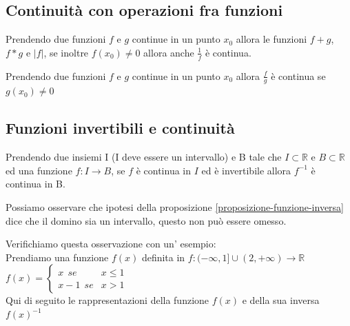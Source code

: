 \subsection{Continuità con operazioni fra funzioni}
\begin{theorem}
    Prendendo due funzioni $f$ e $g$ continue in un punto $x_0$ allora le funzioni $f + g$, $f * g$ e $|f|$, se inoltre $f(x_0) \neq 0$ allora anche $\frac{1}{f}$ è continua.
    \begin{corollaries}
        Prendendo due funzioni $f$ e $g$ continue in un punto $x_0$ allora $\frac{f}{g}$ è continua se $g(x_0) \neq 0$
    \end{corollaries}
\end{theorem}

\subsection{Funzioni invertibili e continuità}
\begin{proposition}\label{proposizione-funzione-inversa}
    Prendendo due insiemi I (I deve essere un intervallo) e B tale che $I \subset \mathbb{R}$ e $B \subset \mathbb{R}$ ed una funzione $f: I \longrightarrow B$, se $f$ è continua in $I$ ed è invertibile allora $f^{-1}$ è continua in B.
\end{proposition}
\begin{observation}
    Possiamo osservare che ipotesi della proposizione \ref{proposizione-funzione-inversa} dice che il domino sia un intervallo, questo non può essere omesso. 
\end{observation}
\begin{example}
    Verifichiamo questa osservazione con un' esempio:\\
    Prendiamo una funzione $f(x)$ definita in $f: (-\infty, 1] \cup (2, +\infty) \longrightarrow \mathbb{R}$ \: \: \: $f(x) = 
    \begin{cases}
        x \: \: se & x \leq 1 \\
        x - 1 \: \: se & x > 1
    \end{cases}
    $\\
    Qui di seguito le rappresentazioni della funzione $f(x)$ e della sua inversa $f(x)^{-1}$
\end{example}
